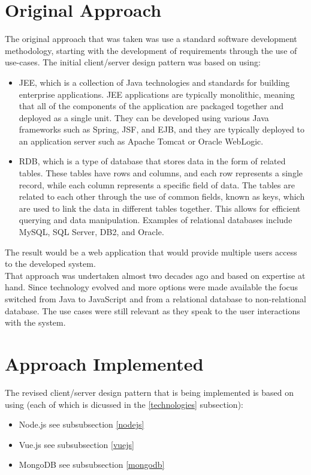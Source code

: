 \section{Original Approach}
The original approach that was taken was use a standard software development methodology, starting with the development of requirements through the use of use-cases. The initial client/server design pattern was based on using:
\begin{itemize}
\item \ac{JEE}, which is a collection of Java technologies and standards for building enterprise applications. \ac{JEE} applications are typically monolithic, meaning that all of the components of the application are packaged together and deployed as a single unit. They can be developed using various Java frameworks such as Spring, \ac{JSF}, and \ac{EJB}, and they are typically deployed to an application server such as Apache Tomcat or Oracle WebLogic.
\item \ac{RDB}, which is a type of database that stores data in the form of related tables. These tables have rows and columns, and each row represents a single record, while each column represents a specific field of data. The tables are related to each other through the use of common fields, known as keys, which are used to link the data in different tables together. This allows for efficient querying and data manipulation. Examples of relational databases include MySQL, SQL Server, DB2, and Oracle.
\end{itemize}
The result would be a web application that would provide multiple users access to the developed system.\vspace{5mm} \\
That approach was undertaken almost two decades ago and based on expertise at hand. Since technology evolved and more options were made available the focus switched from Java to JavaScript and from a relational database to non-relational database. The use cases were still relevant as they speak to the user interactions with the system.
\section{Approach Implemented}
The revised client/server design pattern that is being implemented is based on using (each of which is dicussed in the \ref{technologies}  subsection):
\begin{itemize}
\item Node.js see subsubsection \ref{nodejs}
\item Vue.js see subsubsection \ref{vuejs}
\item MongoDB see subsubsection \ref{mongodb}
\end{itemize}
